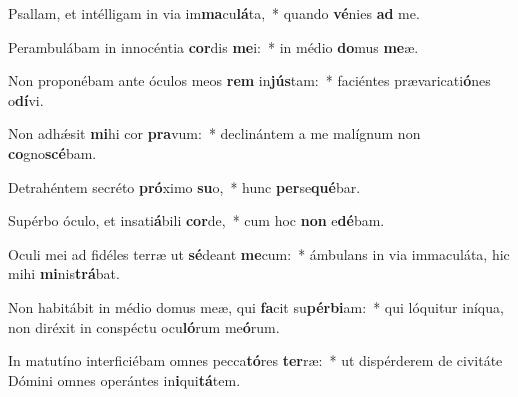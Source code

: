 \item Psallam, et intélligam in via im\textbf{ma}cu\textbf{lá}ta,~* quando \textbf{vé}nies \textbf{ad} me.
\item Perambulábam in innocéntia \textbf{cor}dis \textbf{me}i:~* in médio \textbf{do}mus \textbf{me}æ.
\item Non proponébam ante óculos meos \textbf{rem} in\textbf{jús}tam:~* faciéntes prævaricati\textbf{ó}nes o\textbf{dí}vi.
\item Non adhǽsit \textbf{mi}hi cor \textbf{pra}vum:~* declinántem a me malígnum non \textbf{co}gno\textbf{scé}bam.
\item Detrahéntem secréto \textbf{pró}ximo \textbf{su}o,~* hunc \textbf{per}se\textbf{qué}bar.
\item Supérbo óculo, et insati\textbf{á}bili \textbf{cor}de,~* cum hoc \textbf{non} e\textbf{dé}bam.
\item Oculi mei ad fidéles terræ ut \textbf{sé}deant \textbf{me}cum:~* ámbulans in via immaculáta, hic mihi \textbf{mi}nis\textbf{trá}bat.
\item Non habitábit in médio domus meæ, qui \textbf{fa}cit su\textbf{pér}\textbf{bi}am:~* qui lóquitur iníqua, non diréxit in conspéctu ocu\textbf{ló}rum me\textbf{ó}rum.
\item In matutíno interficiébam omnes pecca\textbf{tó}res \textbf{ter}ræ:~* ut dispérderem de civitáte Dómini omnes operántes in\textbf{i}qui\textbf{tá}tem.
